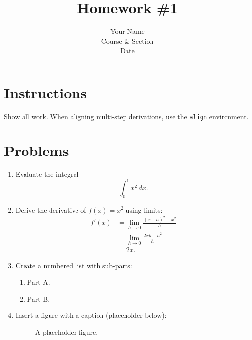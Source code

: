 \documentclass[11pt]{article}
\title{Homework \#1}
\author{Your Name \\ Course \& Section \\ Date}
\date{}
\begin{document}
\maketitle

\section*{Instructions}
Show all work. When aligning multi-step derivations, use the \texttt{align} environment.

\section*{Problems}
\begin{enumerate}
  \item Evaluate the integral
  \[\int_{0}^{1} x^2\,dx.\]
  \item Derive the derivative of $f(x)=x^2$ using limits:
\begin{align}
  f'(x) &= \lim_{h\to 0} \frac{(x+h)^2 - x^2}{h} \\
         &= \lim_{h\to 0} \frac{2xh + h^2}{h} \\
         &= 2x.
\end{align}
  \item Create a numbered list with sub-parts:
  \begin{enumerate}
    \item Part A.
    \item Part B.
  \end{enumerate}
  \item Insert a figure with a caption (placeholder below):
  \begin{figure}[h]
    \centering
    \fbox{\rule{0pt}{1.2in}\rule{1.8in}{0pt}}
    \caption{A placeholder figure.}
  \end{figure}
\end{enumerate}
\end{document}
